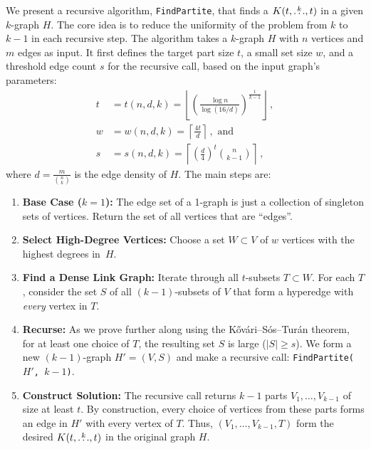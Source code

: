 We present a recursive algorithm, \texttt{FindPartite}, that finds a $K(t, \overset{k}{\dots}, t)$ in a given $k$-graph $H$.
The core idea is to reduce the uniformity of the problem from $k$ to $k-1$ in each recursive step.
The algorithm takes a $k$-graph $H$ with $n$ vertices and $m$ edges as input.
It first defines the target part size $t$, a small set size $w$,
and a threshold edge count $s$ for the recursive call, based on the input graph's parameters:
\begin{align*}
    t &= t(n, d, k) = \left\lfloor \left( \frac{\log n}{\log (16/d)}  \right)^{\frac{1}{k-1}} \right \rfloor\,, \\
    w &= w(n, d, k) = \left\lceil \frac{4 t}{d} \right\rceil\,, \text{ and } \\
    s &= s(n, d, k) = \left\lceil \left( \frac{d}{4} \right)^t \binom{n}{k-1} \right\rceil\,,
\end{align*}
where $d = \frac{m}{\binom{n}{k}}$ is the edge density of $H$.
The main steps are:
\begin{enumerate}
    \item \textbf{Base Case ($k=1$):} The edge set of a 1-graph is just a collection of singleton sets of vertices.
    Return the set of all vertices that are ``edges''.

    \item \textbf{Select High-Degree Vertices:} Choose a set $W \subset V$ of $w$ vertices with the highest degrees in~$H$. \label{W}

    \item \textbf{Find a Dense Link Graph:} Iterate through all $t$-subsets $T \subset W$.
    For each $T$, consider the set $S$ of all $(k-1)$-subsets of $V$ that form a hyperedge with \emph{every} vertex in $T$. \label{link}

    \item \textbf{Recurse:} As we prove further along using the Kőv\'{a}ri–S\'{o}s–Tur\'{a}n theorem, for at least one choice of $T$,
    the resulting set $S$ is large ($|S| \ge s$). We form a new $(k-1)$-graph $H'=(V, S)$ and make a recursive call: \texttt{FindPartite($H'$, $k-1$)}.

    \item \textbf{Construct Solution:} The recursive call returns $k-1$ parts $V_1, \dots, V_{k-1}$ of size at least $t$.
    By construction, every choice of vertices from these parts forms an edge in $H'$ with every vertex of $T$.
    Thus, $(V_1, \dots, V_{k-1}, T)$ form the desired $K(t, \overset{k}{\dots}, t)$ in the original graph $H$.

\end{enumerate}

